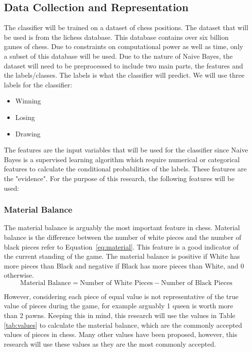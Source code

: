 \documentclass{article}
\begin{document}
\subsection{Data Collection and Representation}
\label{sec:data}
The classifier will be trained on a dataset of chess positions. The dataset that will be used 
is from the lichess database. This database contains over six billion games of chess. Due to 
constraints on computational power as well as time, only a subset of this database will be used.
Due to the nature of Naive Bayes, the dataset will need to be preprocessed to include two main parts, 
the features and the labels/classes. The labels is what the classifier will predict. We will 
use three labels for the classifier:
\begin{itemize}
    \item Winning
    \item Losing
    \item Drawing
\end{itemize}

The features are the input variables that will be used 
for the classifier since Naive Bayes is a supervised learning algorithm which require numerical 
or categorical features to calculate the conditional probabilities of the labels. These features
are the "evidence". For the purpose of this research, the following features will be used:

\subsubsection{Material Balance}
\label{sec:material}
The material balance is arguably the most important feature in chess. Material balance is the
difference between the number of white pieces and the number of black pieces refer to Equation~\ref{eq:material}.
This feature is a good indicator of the current standing of the game. The material balance is 
positive if White has more pieces than Black and negative if Black has more pieces than White,
and 0 otherwise.
\begin{equation}
    \label{eq:material}
    \text{Material Balance} = \text{Number of White Pieces} - \text{Number of Black Pieces} 
\end{equation}


However, considering each piece of equal value is not representative of the true value of pieces
during the game, for example arguably 1 queen is worth more than 2 pawns. Keeping this in mind,
this research will use the values in Table \ref{tab:values} to calculate the material balance,
which are the commonly accepted values of pieces in chess\cite{guptaDeterminingChessPiece2023}.
Many other values have been proposed, however, this research will use these values as they are
the most commonly accepted. 
\end{document}
